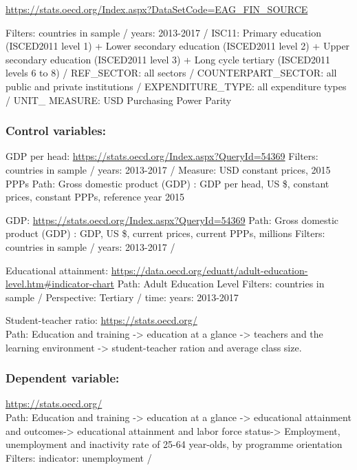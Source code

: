\documentclass[
]{article}
\begin{document}
\url{https://stats.oecd.org/Index.aspx?DataSetCode=EAG_FIN_SOURCE}

Filters: countries in sample / years: 2013-2017 / ISC11: Primary
education (ISCED2011 level 1) + Lower secondary education (ISCED2011
level 2) + Upper secondary education (ISCED2011 level 3) + Long cycle
tertiary (ISCED2011 levels 6 to 8) / REF\_SECTOR: all sectors /
COUNTERPART\_SECTOR: all public and private institutions /
EXPENDITURE\_TYPE: all expenditure types / UNIT\_ MEASURE: USD
Purchasing Power Parity

\hypertarget{control-variables-1}{%
\subsubsection{Control variables:}\label{control-variables-1}}

GDP per head: \url{https://stats.oecd.org/Index.aspx?QueryId=54369}
Filters: countries in sample / years: 2013-2017 / Measure: USD constant
prices, 2015 PPPs Path: Gross domestic product (GDP) : GDP per head, US
\$, constant prices, constant PPPs, reference year 2015

GDP: \url{https://stats.oecd.org/Index.aspx?QueryId=54369} Path: Gross
domestic product (GDP) : GDP, US \$, current prices, current PPPs,
millions Filters: countries in sample / years: 2013-2017 /

Educational attainment:
\url{https://data.oecd.org/eduatt/adult-education-level.htm\#indicator-chart}
Path: Adult Education Level Filters: countries in sample / Perspective:
Tertiary / time: years: 2013-2017

Student-teacher ratio: \url{https://stats.oecd.org/}\\
Path: Education and training -\textgreater{} education at a glance
-\textgreater{} teachers and the learning environment -\textgreater{}
student-teacher ration and average class size.

\hypertarget{dependent-variable-1}{%
\subsubsection{Dependent variable:}\label{dependent-variable-1}}

\url{https://stats.oecd.org/}~\\
Path: Education and training -\textgreater{} education at a glance
-\textgreater{} educational attainment and outcomes-\textgreater{}
educational attainment and labor force status-\textgreater{} Employment,
unemployment and inactivity rate of 25-64 year-olds, by programme
orientation Filters: indicator: unemployment /
\end{document}
